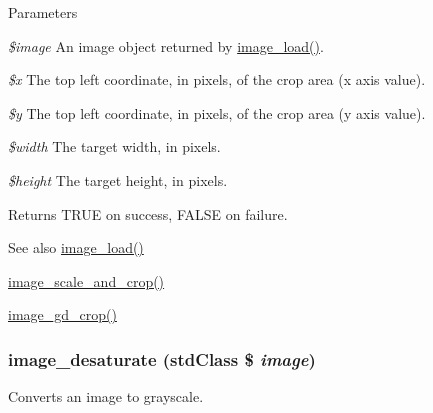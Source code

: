 \begin{DoxyParams}{Parameters}
\item[{\em \$image}]An image object returned by \hyperlink{group__image_ga96098e5b039dc3906a656fa889a04776}{image\_\-load()}. \item[{\em \$x}]The top left coordinate, in pixels, of the crop area (x axis value). \item[{\em \$y}]The top left coordinate, in pixels, of the crop area (y axis value). \item[{\em \$width}]The target width, in pixels. \item[{\em \$height}]The target height, in pixels.\end{DoxyParams}
\begin{DoxyReturn}{Returns}
TRUE on success, FALSE on failure.
\end{DoxyReturn}
\begin{DoxySeeAlso}{See also}
\hyperlink{group__image_ga96098e5b039dc3906a656fa889a04776}{image\_\-load()} 

\hyperlink{group__image_ga8d6850eecb498cf1683808eb66b74465}{image\_\-scale\_\-and\_\-crop()} 

\hyperlink{group__image_ga80d6e99f7b538e40dac6b917bfff1bb1}{image\_\-gd\_\-crop()} 
\end{DoxySeeAlso}
\hypertarget{group__image_gadfcfdfcf1521b26ec790fc017c151aff}{
\subsubsection[{image\_\-desaturate}]{\setlength{\rightskip}{0pt plus 5cm}image\_\-desaturate (stdClass \$ {\em image})}}
\label{group__image_gadfcfdfcf1521b26ec790fc017c151aff}
Converts an image to grayscale.


